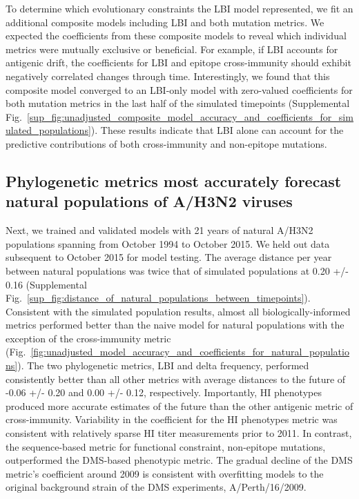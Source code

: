 To determine which evolutionary constraints the LBI model represented, we fit an additional composite models including LBI and both mutation metrics.
We expected the coefficients from these composite models to reveal which individual metrics were mutually exclusive or beneficial.
For example, if LBI accounts for antigenic drift, the coefficients for LBI and epitope cross-immunity should exhibit negatively correlated changes through time.
Interestingly, we found that this composite model converged to an LBI-only model with zero-valued coefficients for both mutation metrics in the last half of the simulated timepoints (Supplemental Fig.~\ref{sup_fig:unadjusted_composite_model_accuracy_and_coefficients_for_simulated_populations}).
These results indicate that LBI alone can account for the predictive contributions of both cross-immunity and non-epitope mutations.

\subsection*{Phylogenetic metrics most accurately forecast natural populations of A/H3N2 viruses}

Next, we trained and validated models with 21 years of natural A/H3N2 populations spanning from October 1994 to October 2015.
We held out data subsequent to October 2015 for model testing.
The average distance per year between natural populations was twice that of simulated populations at 0.20 +/- 0.16 (Supplemental Fig.~\ref{sup_fig:distance_of_natural_populations_between_timepoints}).
Consistent with the simulated population results, almost all biologically-informed metrics performed better than the naive model for natural populations with the exception of the cross-immunity metric (Fig.~\ref{fig:unadjusted_model_accuracy_and_coefficients_for_natural_populations}).
The two phylogenetic metrics, LBI and delta frequency, performed consistently better than all other metrics with average distances to the future of -0.06 +/- 0.20 and 0.00 +/- 0.12, respectively.
Importantly, HI phenotypes produced more accurate estimates of the future than the other antigenic metric of cross-immunity.
Variability in the coefficient for the HI phenotypes metric was consistent with relatively sparse HI titer measurements prior to 2011.
In contrast, the sequence-based metric for functional constraint, non-epitope mutations, outperformed the DMS-based phenotypic metric.
The gradual decline of the DMS metric's coefficient around 2009 is consistent with overfitting models to the original background strain of the DMS experiments, A/Perth/16/2009.

